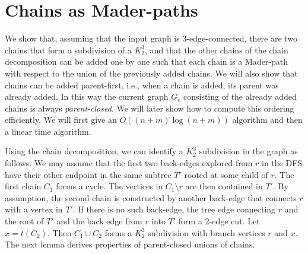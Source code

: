 \documentclass[paper=a4]{scrartcl}
\begin{document}
\section{Chains as Mader-paths}\label{Chains as Mader-paths}

We show that, assuming that the input graph is 3-edge-connected, there are two chains that form a subdivision of a $K_2^3$, and that the other chains of the chain decomposition can be added one by one such that each chain is a Mader-path with respect to the union of the previously added chains. We will also show that chains can be added parent-first, i.e., when a chain is added, its parent was already added. In this way the current graph $G_c$ consisting of the already added chains is always \emph{parent-closed}. We will later show how to compute this ordering efficiently. We will first give an $O((n + m) \log (n + m))$ algorithm and then a linear time algorithm.




Using the chain decomposition, we can identify a $K_2^3$ subdivision in the graph as follows. We may assume that the first two back-edges explored from $r$ in the DFS have their other endpoint in the same subtree $T'$ rooted at some child of $r$. The first chain $C_1$ forms a cycle. The vertices in $C_1 \setminus r$ are then contained in $T'$. By assumption, the second chain is constructed by another back-edge that connects $r$ with a vertex in $T'$. If there is no such back-edge, the tree edge connecting $r$ and the root of $T'$ and the back edge from $r$ into $T'$ form a $2$-edge cut. 
Let $x = t(C_2)$. Then $C_1\cup C_2$ forms a $K_2^3$ subdivision with branch vertices $r$ and $x$. The next lemma derives properties of parent-closed unions of chains.
\end{document}

